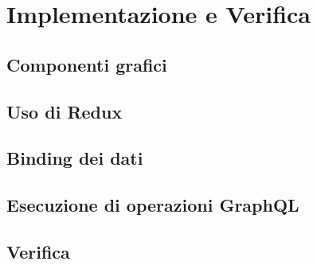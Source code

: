 \chapter{Implementazione e Verifica}

\section{Componenti grafici}

\section{Uso di Redux}

\section{Binding dei dati}

\section{Esecuzione di operazioni GraphQL}

\section{Verifica}